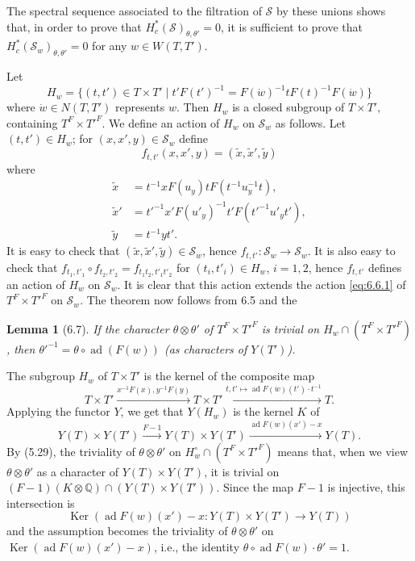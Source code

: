 \documentclass[11pt]{amsart}
\theoremstyle{plain}
\newtheorem{lemma}[theorem]{Lemma}
\theoremstyle{remark}
\DeclareMathOperator{\Ker}{Ker}
\DeclareMathOperator{\ad}{ad}
\begin{document}
The spectral sequence associated to the filtration of $\mathcal{S}$ by these unions shows that, in order to prove that $H_c^*(\mathcal{S})_{\theta, \theta'} = 0$, it is sufficient to prove that $H_c^*(\mathcal{S}_w)_{\theta, \theta'} = 0$ for any $w \in W(T, T')$.

Let
\[
H_w = \{(t, t') \in T \times T' \mid t'F(t')^{-1} = F(\dot{w})^{-1}tF(t)^{-1}F(\dot{w})\}
\]
where $\dot{w} \in N(T, T')$ represents $w$. Then $H_w$ is a closed subgroup of $T \times T'$, containing $T^F \times T'^F$. We define an action of $H_w$ on $\mathcal{S}_w$ as follows. Let $(t, t') \in H_w$; for $(x, x', y) \in \mathcal{S}_w$ define
\[
f_{t,t'}(x, x', y) = (\tilde{x}, \tilde{x}', \tilde{y})
\]
where
\begin{align*}
\tilde{x} &= t^{-1}xF(u_y)tF(t^{-1}u_y^{-1}t), \\
\tilde{x}' &= t'^{-1}x'F(u'_y)^{-1}t'F(t'^{-1}u'_yt'), \\
\tilde{y} &= t^{-1}yt'.
\end{align*}
It is easy to check that $(\tilde{x}, \tilde{x}', \tilde{y}) \in \mathcal{S}_w$, hence $f_{t,t'}: \mathcal{S}_w \to \mathcal{S}_w$. It is also easy to check that $f_{t_1,t'_1} \circ f_{t_2,t'_2} = f_{t_1t_2, t'_1t'_2}$ for $(t_i, t'_i) \in H_w$, $i = 1, 2$, hence $f_{t,t'}$ defines an action of $H_w$ on $\mathcal{S}_w$. It is clear that this action extends the action \eqref{eq:6.6.1} of $T^F \times T'^F$ on $\mathcal{S}_w$. The theorem now follows from 6.5 and the

\begin{lemma}[6.7]
If the character $\theta \otimes \theta'$ of $T^F \times T'^F$ is trivial on $H_w \cap (T^F \times T'^F)$, then $\theta'^{-1} = \theta \circ \ad(F(w))$ (as characters of $Y(T')$).
\end{lemma}

The subgroup $H_w$ of $T \times T'$ is the kernel of the composite map
\[
T \times T' \xrightarrow{x^{-1}F(x), y^{-1}F(y)} T \times T' \xrightarrow{t, t' \mapsto \ad F(\dot{w})(t') \cdot t^{-1}} T.
\]
Applying the functor $Y$, we get that $Y(H_w)$ is the kernel $K$ of
\[
Y(T) \times Y(T') \xrightarrow{F-1} Y(T) \times Y(T') \xrightarrow{\ad F(w)(x') - x} Y(T).
\]
By (5.29), the triviality of $\theta \otimes \theta'$ on $H_w^\circ \cap (T^F \times T'^F)$ means that, when we view $\theta \otimes \theta'$ as a character of $Y(T) \times Y(T')$, it is trivial on $(F - 1)(K \otimes \mathbb{Q}) \cap (Y(T) \times Y(T'))$. Since the map $F - 1$ is injective, this intersection is
\[
\Ker(\ad F(w)(x') - x: Y(T) \times Y(T') \longrightarrow Y(T))
\]
and the assumption becomes the triviality of $\theta \otimes \theta'$ on $\Ker(\ad F(w)(x') - x)$, i.e., the identity $\theta \circ \ad F(w) \cdot \theta' = 1$.
\end{document}
